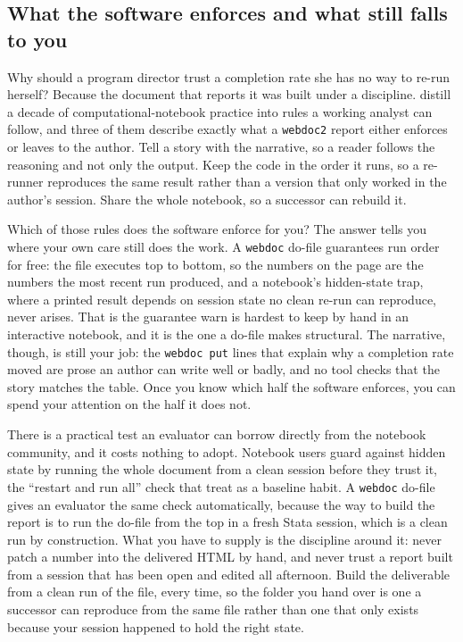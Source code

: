 \documentclass[
    a4paper,
    fontsize=10pt,
    twoside=true,
    numbers=noenddot,
]{kaobook}
\begin{document}
\subsection{What the software enforces and what still falls to you}
Why should a program director trust a completion rate she has no way to re-run herself? Because the document that reports it was built under a discipline. \textcite{rule2019ten} distill a decade of computational-notebook practice into rules a working analyst can follow, and three of them describe exactly what a \texttt{webdoc2} report either enforces or leaves to the author. Tell a story with the narrative, so a reader follows the reasoning and not only the output. Keep the code in the order it runs, so a re-runner reproduces the same result rather than a version that only worked in the author's session. Share the whole notebook, so a successor can rebuild it.

Which of those rules does the software enforce for you? The answer tells you where your own care still does the work. A \texttt{webdoc} do-file guarantees run order for free: the file executes top to bottom, so the numbers on the page are the numbers the most recent run produced, and a notebook's hidden-state trap, where a printed result depends on session state no clean re-run can reproduce, never arises. That is the guarantee \textcite{rule2019ten} warn is hardest to keep by hand in an interactive notebook, and it is the one a do-file makes structural. The narrative, though, is still your job: the \texttt{webdoc put} lines that explain why a completion rate moved are prose an author can write well or badly, and no tool checks that the story matches the table. Once you know which half the software enforces, you can spend your attention on the half it does not.

There is a practical test an evaluator can borrow directly from the notebook community, and it costs nothing to adopt. Notebook users guard against hidden state by running the whole document from a clean session before they trust it, the \enquote{restart and run all} check that \textcite{rule2019ten} treat as a baseline habit. A \texttt{webdoc} do-file gives an evaluator the same check automatically, because the way to build the report is to run the do-file from the top in a fresh Stata session, which is a clean run by construction. What you have to supply is the discipline around it: never patch a number into the delivered HTML by hand, and never trust a report built from a session that has been open and edited all afternoon. Build the deliverable from a clean run of the file, every time, so the folder you hand over is one a successor can reproduce from the same file rather than one that only exists because your session happened to hold the right state.
\end{document}
